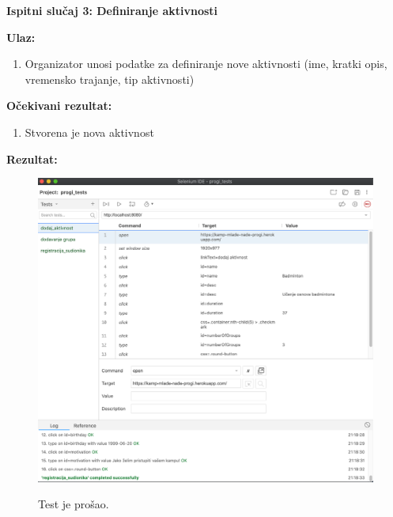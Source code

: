 			\textbf{}
			
			\textbf{Ispitni slučaj 3: Definiranje aktivnosti}
			
			\textbf{Ulaz:}
			\begin{enumerate}
			    \item Organizator unosi podatke za definiranje nove aktivnosti (ime, kratki opis, vremensko trajanje, tip aktivnosti)
			\end{enumerate}
			
			\textbf{Očekivani rezultat:}
			
			\begin{enumerate}
			    \item Stvorena je nova aktivnost
			\end{enumerate}
			
			\textbf{Rezultat:} 
			
			\begin{figure}[H]
            \includegraphics[scale=0.3]{dokumentacija/slike/DODAJ_AKTIVNOSTI_TEST.png} %
            \centering
            
            Test je prošao.
            \label{fig:promjene}
            \end{figure}
    
